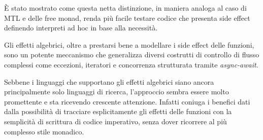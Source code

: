 È stato mostrato come questa netta distinzione, in maniera analoga al caso di MTL e delle free monad, renda più facile testare codice che presenta side effect definendo interpreti ad hoc in base alla necessità.

Gli effetti algebrici, oltre a prestarsi bene a modellare i side effect delle funzioni, sono un potente meccanismo che generalizza diversi costrutti di controllo di flusso complessi come eccezioni, iteratori e concorrenza strutturata tramite \emph{async-await}.

Sebbene i linguaggi che supportano gli effetti algebrici siano ancora principalmente solo linguaggi di ricerca, l'approccio sembra essere molto promettente e sta ricevendo crescente attenzione. Infatti coniuga i benefici dati dalla possibilità di tracciare esplicitamente gli effetti delle funzioni con la semplicità di scrittura di codice imperativo, senza dover ricorrere al più complesso stile monadico.
